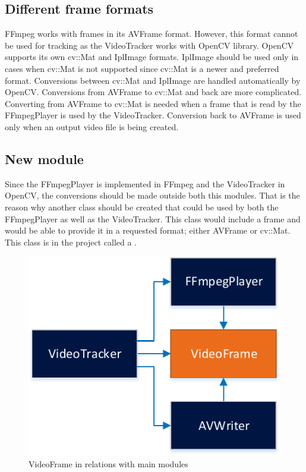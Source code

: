 \subsection{Different frame formats}
FFmpeg works with frames in its AVFrame format. However, this format cannot be used for tracking as the VideoTracker works with OpenCV library. OpenCV supports its own cv::Mat and IplImage formats. IplImage should be used only in cases when cv::Mat is not supported since cv::Mat is a newer and preferred format. Conversions between cv::Mat and IplImage are handled automatically by OpenCV. Conversions from AVFrame to cv::Mat and back are more complicated. Converting from AVFrame to cv::Mat is needed when a frame that is read by the FFmpegPlayer is used by the VideoTracker. Conversion back to AVFrame is used only when an output video file is being created.

\subsection{New module}
Since the FFmpegPlayer is implemented in FFmpeg and the VideoTracker in OpenCV, the conversions should be made outside both this modules. That is the reason why another class should be created that could be used by both the FFmpegPlayer as well as the VideoTracker. This class would include a frame and would be able to provide it in a requested format; either AVFrame or cv::Mat. This class is in the project called a .
\begin{figure}[!htbp]
\centering
\includegraphics{fig/videoframe}
\caption{VideoFrame in relations with main modules}
\label{fig:videoframe}
\end{figure}

